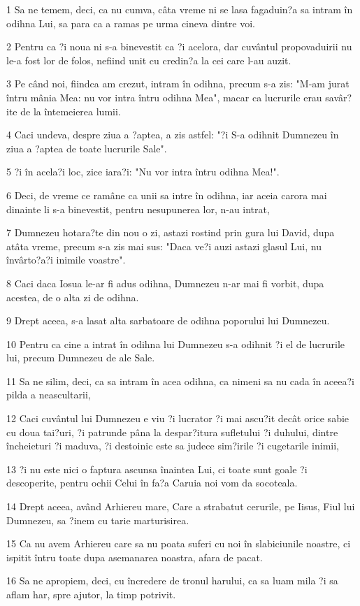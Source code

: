 \par 1 Sa ne temem, deci, ca nu cumva, câta vreme ni se lasa fagaduin?a sa intram în odihna Lui, sa para ca a ramas pe urma cineva dintre voi.
\par 2 Pentru ca ?i noua ni s-a binevestit ca ?i acelora, dar cuvântul propovaduirii nu le-a fost lor de folos, nefiind unit cu credin?a la cei care l-au auzit.
\par 3 Pe când noi, fiindca am crezut, intram în odihna, precum s-a zis: "M-am jurat întru mânia Mea: nu vor intra întru odihna Mea", macar ca lucrurile erau savâr?ite de la întemeierea lumii.
\par 4 Caci undeva, despre ziua a ?aptea, a zis astfel: "?i S-a odihnit Dumnezeu în ziua a ?aptea de toate lucrurile Sale".
\par 5 ?i în acela?i loc, zice iara?i: "Nu vor intra întru odihna Mea!".
\par 6 Deci, de vreme ce ramâne ca unii sa intre în odihna, iar aceia carora mai dinainte li s-a binevestit, pentru nesupunerea lor, n-au intrat,
\par 7 Dumnezeu hotara?te din nou o zi, astazi rostind prin gura lui David, dupa atâta vreme, precum s-a zis mai sus: "Daca ve?i auzi astazi glasul Lui, nu învârto?a?i inimile voastre".
\par 8 Caci daca Iosua le-ar fi adus odihna, Dumnezeu n-ar mai fi vorbit, dupa acestea, de o alta zi de odihna.
\par 9 Drept aceea, s-a lasat alta sarbatoare de odihna poporului lui Dumnezeu.
\par 10 Pentru ca cine a intrat în odihna lui Dumnezeu s-a odihnit ?i el de lucrurile lui, precum Dumnezeu de ale Sale.
\par 11 Sa ne silim, deci, ca sa intram în acea odihna, ca nimeni sa nu cada în aceea?i pilda a neascultarii,
\par 12 Caci cuvântul lui Dumnezeu e viu ?i lucrator ?i mai ascu?it decât orice sabie cu doua tai?uri, ?i patrunde pâna la despar?itura sufletului ?i duhului, dintre încheieturi ?i maduva, ?i destoinic este sa judece sim?irile ?i cugetarile inimii,
\par 13 ?i nu este nici o faptura ascunsa înaintea Lui, ci toate sunt goale ?i descoperite, pentru ochii Celui în fa?a Caruia noi vom da socoteala.
\par 14 Drept aceea, având Arhiereu mare, Care a strabatut cerurile, pe Iisus, Fiul lui Dumnezeu, sa ?inem cu tarie marturisirea.
\par 15 Ca nu avem Arhiereu care sa nu poata suferi cu noi în slabiciunile noastre, ci ispitit întru toate dupa asemanarea noastra, afara de pacat.
\par 16 Sa ne apropiem, deci, cu încredere de tronul harului, ca sa luam mila ?i sa aflam har, spre ajutor, la timp potrivit.

